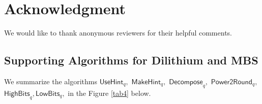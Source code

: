 \documentclass[conference]{IEEEtran}
\begin{document}
		\section*{Acknowledgment}
		We would like to thank anonymous reviewers for their helpful comments.
		
		
	
	
		\iffalse		
		\appendix

		\subsection{Supporting Algorithms for \textsf{Dilithium} and \textsf{MBS}} \label{suppor}
		
		We summarize the algorithms $ \textsf{UseHint}_q,$ $ \textsf{MakeHint}_q,$ $ \textsf{Decompose}_q, $ $ \textsf{Power2Round}_q,$ $ \textsf{HighBits}_q, \textsf{LowBits}_q,$ in the Figure \ref{tab4} below.
	
\end{document}
